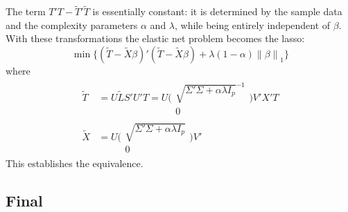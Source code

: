 \documentclass[a4paper]{article}
\newcommand{\nrm}[1]{{\left\| #1 \right \|}}
\begin{document}
The term $T'T - \tilde{T}'\tilde{T}$ is essentially constant: it is determined by the sample data and the complexity parameters $\alpha$ and $\lambda$, while being entirely independent of $\beta$. With these transformations the elastic net problem becomes the lasso:
\[\min\Big\{ (\tilde{T} - \tilde{X}\beta)'(\tilde{T} - \tilde{X}\beta) + \lambda(1-\alpha)\nrm{\beta}_1 \Big\}\]
where
\begin{align*}
	\tilde{T} &= U\tilde{L}S'U'T = U\bigg(\begin{matrix} \sqrt{\Sigma'\Sigma+\alpha \lambda I_p}^{-1} \\ 0 \end{matrix}\bigg) V' X'T\\
	\tilde{X} &= U\bigg(\begin{matrix} \sqrt{\Sigma'\Sigma+\alpha \lambda I_p} \\ 0 \end{matrix}\bigg) V'
\end{align*}
This establishes the equivalence.


\subsection*{Final} %
\label{sub:final}
\end{document}
